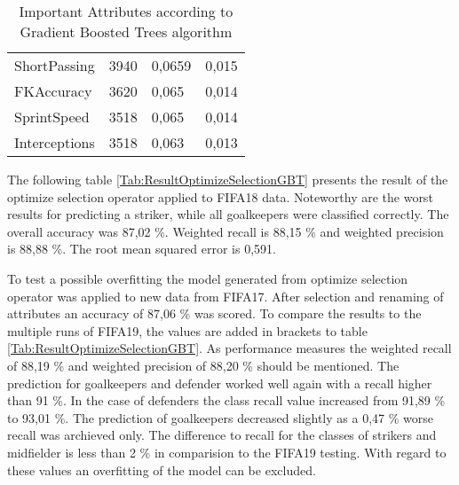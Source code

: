 \begin{table}[]
\begin{tabular}{@{}llll@{}}
ShortPassing    & 3940                                                                                                                                   & 0,0659                                                                                                                               & 0,015      \\
FKAccuracy      & 3620                                                                                                                                   & 0,065                                                                                                                                & 0,014      \\
SprintSpeed     & 3518                                                                                                                                   & 0,065                                                                                                                                & 0,014      \\
Interceptions   & 3518                                                                                                                                   & 0,063                                                                                                                                & 0,013      \\ \hline
\end{tabular}
\label{Tab:GBTImportantAttributes}
\caption{Important Attributes according to Gradient Boosted Trees algorithm}
\end{table}

The following table \ref{Tab:ResultOptimizeSelectionGBT} presents the result of the optimize selection operator applied to FIFA18 data. Noteworthy are the worst results for predicting a striker, while all goalkeepers were classified correctly. The overall accuracy was 87,02 \%. Weighted recall is 88,15 \% and weighted precision is 88,88 \%. The root mean squared error is 0,591. 

To test a possible overfitting the model generated from optimize selection operator was applied to new data from FIFA17. After selection and renaming of attributes an accuracy of 87,06 \% was scored. To compare the results to the multiple runs of FIFA19, the values are added in brackets to table \ref{Tab:ResultOptimizeSelectionGBT}. As performance measures the weighted recall of 88,19 \% and weighted precision of 88,20 \% should be mentioned.
The prediction for goalkeepers and defender worked well again with a recall higher than 91 \%. In the case of defenders the class recall value increased from 91,89 \% to 93,01 \%. The prediction of goalkeepers decreased slightly as a 0,47 \% worse recall was archieved only. The difference to recall for the classes of strikers and midfielder is less than 2 \% in comparision to the FIFA19 testing. With regard to these values an overfitting of the model can be excluded. 


